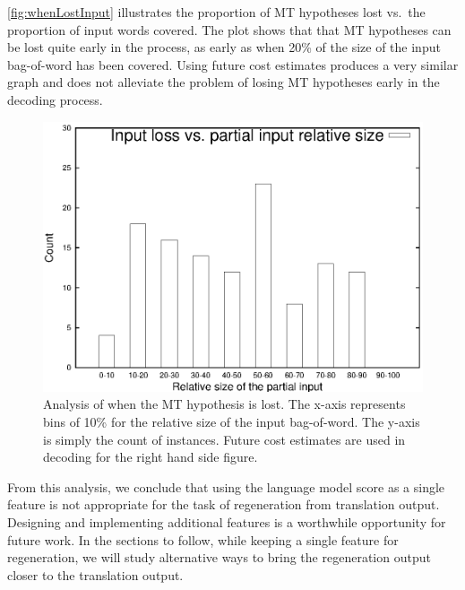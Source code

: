 \autoref{fig:whenLostInput} illustrates the proportion of MT hypotheses
lost vs.\ the proportion of input words covered.
The plot shows that
that MT hypotheses can be lost quite early in the process, as early as
when 20\% of the size of the input bag-of-word has been covered.
Using future cost estimates produces a very similar graph and does not
alleviate the problem of losing MT hypotheses early in the decoding process.
%
\begin{figure}
\begin{center}
  \includegraphics[scale = 0.8]{figures/whenLostInput/Tune.text.nw.v3x08.1stpass.10best.exp.allrules.mmap.nbest1000.1.whenlostinput.eps}
\caption{Analysis of when the MT hypothesis is lost. The x-axis represents bins of 10\% for the relative size of the input bag-of-word.
The y-axis is simply the count of instances. Future cost estimates are used in decoding for the right hand side figure.}
\label{fig:whenLostInput}
\end{center}
\end{figure}
%

From this analysis, we conclude that using the language model score as
a single feature is not appropriate for the task of regeneration from
translation output. Designing and implementing additional features is
a worthwhile opportunity for future work. In the sections to follow, while
keeping a single feature for regeneration, we will study
alternative ways to bring the regeneration output closer to the translation output.

